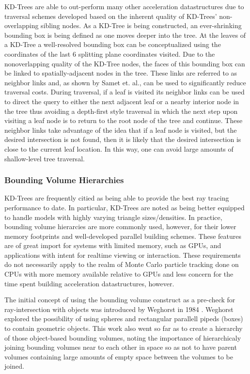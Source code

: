 \documentclass[12pt, a4paper]{article}
\begin{document}
KD-Trees are able to out-perform many other acceleration datastructures due to traversal schemes developed based on the inherent quality of KD-Trees' non-overlapping sibling nodes. As a KD-Tree is being constructed, an ever-shrinking bounding box is being defined as one moves deeper into the tree. At the leaves of a KD-Tree a well-resolved bounding box can be conceptualized using the coordinates of the last 6 splitting plane coordinates visited. Due to the nonoverlapping quality of the KD-Tree nodes, the faces of this bounding box can be linked to spatially-adjacent nodes in the tree. These links are referred to as neighbor links \cite{Samet_1989} and, as shown by Samet et. al., can be used to significantly reduce traversal costs. During traversal, if a leaf is visited its neighbor links can be used to direct the query to either the next adjacent leaf or a nearby interior node in the tree thus avoiding a depth-first style traversal in which the next step upon visiting a leaf node is to return to the root node of the tree and continue. These neighbor links take advantage of the idea that if a leaf node is visited, but the desired intersection is not found, then it is likely that the desired intersection is close to the current leaf location. In this way, one can avoid large amounts of shallow-level tree traversal.

\subsubsection{Bounding Volume Hierarchies}%

KD-Trees are frequently citied as being able to provide the best ray tracing performance to date.\cite{Ernst_2007,Hurley_2002,Havran_2000} In particular, KD-Trees are noted as being better equipped to handle models with highly varying triangle sizes/densities. In practice, bounding volume hierarcies are more commonly used, however, for their lower memory footprints and well-developed parallel building schemes. These features are of great import for systems with limited memory, such as GPUs, and applications with intent for realtime viewing or interaction. These requirements do not necessarily apply to the realm of Monte Carlo particle tracking done on CPUs with more memory available relative to GPUs and less concern for the time spent building acceleration datastructures, however. 

The initial concept of using the bounding volume construct as a pre-check for ray-intersection with objects was introduced by Weghorst in 1984 \cite{Weghorst_1984}. Weghorst explored the possibility of using spheres and rectangular parallell pipeds (boxes) to contain geometric objects. This work also went so far as to create a hierarchy of those object-based bounding volumes, noting the importance of hierarchicaly joining bounding volumes near to each other in space so as not to have parent volumes containing large amounts of empty space between the volumes to be joined.
\end{document}
